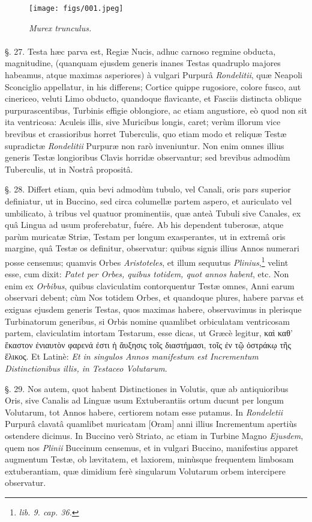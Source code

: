 \documentclass[a4paper, 11pt, oneside, polutonikogreek, german]{article}
\begin{document}
\begin{figure}[H]
\centering
\texttt{[image: figs/001.jpeg]}
\caption{\emph{Murex trunculus.}}
\end{figure}
\paragraph{}
§. 27. Testa hæc parva est, Regiæ Nucis, adhuc carnoso regmine obducta, magnitudine, (quanquam ejusdem generis inanes Testas quadruplo majores habeamus, atque maximas asperiores) à vulgari Purpurâ \emph{Rondelitii}, quæ Neapoli Sconciglio appellatur, in his differens; Cortice quippe rugosiore, colore fusco, aut cinericeo, veluti Limo obducto, quandoque flavicante, et Fasciis distincta oblique purpurascentibus, Turbinis effigie oblongiore, ac etiam angustiore, eò quod non sit ita ventricosa: Aculeis illis, sive Muricibus longis, caret; verùm illorum vice brevibus et crassioribus horret Tuberculis, quo etiam modo et reliquæ Testæ supradictæ \emph{Rondelitii} Purpuræ non rarò inveniuntur. Non enim omnes illius generis Testæ longioribus Clavis horridæ observantur; sed brevibus admodùm Tuberculis, ut in Nostrâ propositâ.

§. 28. Differt etiam, quia bevi admodùm tubulo, vel Canali, oris pars superior definiatur, ut in Buccino, sed circa columellæ partem aspero, et auriculato vel umbilicato, à tribus vel quatuor prominentiis, quæ anteà Tubuli sive Canales, ex quâ Lingua ad usum proferebatur, fuére. Ab his dependent tuberosæ, atque parùm muricatæ Striæ, Testam per longum exasperantes, ut in extremâ oris margine, quâ Testæ os definitur, observatur: quibus signis illius Annos numerari posse censemus; quamvis Orbes \emph{Aristoteles}, et illum sequutus \emph{Plinius},\footnote{\emph{lib. 9. cap. 36.}} velint esse, cum dixit: \emph{Patet per Orbes, quibus totidem, quot annos habent}, etc. Non enim ex \emph{Orbibus}, quibus claviculatim contorquentur Testæ omnes, Anni earum observari debent; cùm Nos totidem Orbes, et quandoque plures, habere parvas et exiguas ejusdem generis Testas, quos maximas habere, observavimus in plerisque Turbinatorum generibus, si Orbis nomine quamlibet orbiculatam ventricosam partem, claviculatim intortam Testarum, esse dicas, ut Græcè legitur, καὶ καθ' ἕκαστον ἐνιαυτὸν φαρενά ἐστι ἡ ἄυξησις τοῖς διαστήμασι, τοῖς ἐν τῷ ὀστράκῳ τῆς ἕλικος. Et Latinè: \emph{Et in singulos Annos manifestum est Incrementum Distinctionibus illis, in Testaceo Volutarum}.

§. 29. Nos autem, quot habent Distinctiones in Volutis, quæ ab antiquioribus Oris, sive Canalis ad Linguæ usum Extuberantiis ortum ducunt per longum Volutarum, tot Annos habere, certiorem notam esse putamus. In \emph{Rondeletii} Purpurâ clavatâ quamlibet muricatam [Oram] anni illius Incrementum apertiùs ostendere dicimus. In Buccino verò Striato, ac etiam in Turbine Magno \emph{Ejusdem}, quem nos \emph{Plinii} Buccinum censemus, et in vulgari Buccino, manifestius apparet augmentum Testæ, ob lævitatem, et laxiorem, minùsque frequentem limbosam extuberantiam, quæ dimidium ferè singularum Volutarum orbem intercipere observatur.
\end{document}
